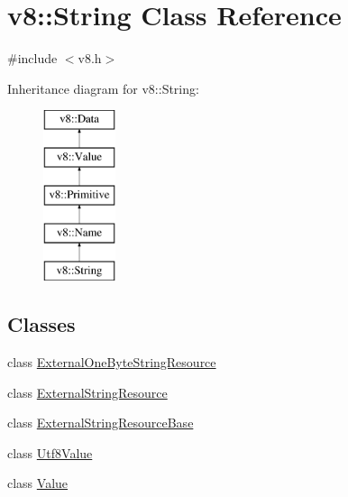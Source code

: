 \hypertarget{classv8_1_1_string}{}\section{v8\+:\+:String Class Reference}
\label{classv8_1_1_string}


{\ttfamily \#include $<$v8.\+h$>$}

Inheritance diagram for v8\+:\+:String\+:\begin{figure}[H]
\begin{center}
\leavevmode
\includegraphics[height=5.000000cm]{classv8_1_1_string}
\end{center}
\end{figure}
\subsection*{Classes}
\begin{DoxyCompactItemize}
\item 
class \hyperlink{classv8_1_1_string_1_1_external_one_byte_string_resource}{External\+One\+Byte\+String\+Resource}
\item 
class \hyperlink{classv8_1_1_string_1_1_external_string_resource}{External\+String\+Resource}
\item 
class \hyperlink{classv8_1_1_string_1_1_external_string_resource_base}{External\+String\+Resource\+Base}
\item 
class \hyperlink{classv8_1_1_string_1_1_utf8_value}{Utf8\+Value}
\item 
class \hyperlink{classv8_1_1_string_1_1_value}{Value}
\end{DoxyCompactItemize}
